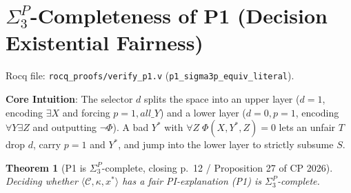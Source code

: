 \documentclass[11pt,a4paper]{article}
\newtheorem{theorem}{Theorem}[section]
\newcommand{\C}{\mathcal{C}}
\newcommand{\code}[1]{\texttt{\small #1}}
\begin{document}
\section{\texorpdfstring{$\Sigma_3^P$}{Sigma\_3\^{}P}-Completeness of P1 (Decision Existential Fairness)}
Rocq file: \code{rocq\_proofs/verify\_p1.v} (\code{p1\_sigma3p\_equiv\_literal}).

\textbf{Core Intuition}: The selector $d$ splits the space into an upper layer ($d=1$, encoding $\exists X$ and forcing $p=1, all\_Y$) and a lower layer ($d=0,p=1$, encoding $\forall Y \exists Z$ and outputting $\neg\Phi$). A bad $Y^*$ with $\forall Z\;\Phi(X,Y^*,Z)=0$ lets an unfair $T$ drop $d$, carry $p=1$ and $Y^*$, and jump into the lower layer to strictly subsume $S$.

\begin{theorem}[P1 is $\Sigma_3^P$-complete, closing p.~12 / Proposition 27 of CP 2026]
Deciding whether $\langle \C, \kappa, x^* \rangle$ has a fair PI-explanation (P1) is $\Sigma_3^P$-complete.
\end{theorem}
\end{document}
